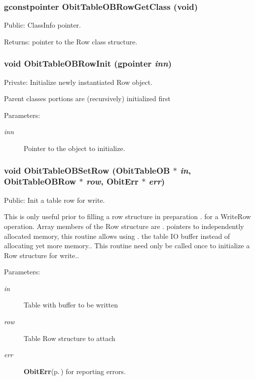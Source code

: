 \subsubsection{\setlength{\rightskip}{0pt plus 5cm}gconstpointer Obit\-Table\-OBRow\-Get\-Class (void)}\label{ObitTableOB_8c_a15}


Public: Class\-Info pointer. 

\begin{Desc}
\item[Returns:]pointer to the Row class structure. \end{Desc}
\subsubsection{\setlength{\rightskip}{0pt plus 5cm}void Obit\-Table\-OBRow\-Init (gpointer {\em inn})}\label{ObitTableOB_8c_a6}


Private: Initialize newly instantiated Row object. 

Parent classes portions are (recursively) initialized first \begin{Desc}
\item[Parameters:]
\begin{description}
\item[{\em inn}]Pointer to the object to initialize. \end{description}
\end{Desc}
\subsubsection{\setlength{\rightskip}{0pt plus 5cm}void Obit\-Table\-OBSet\-Row ({\bf Obit\-Table\-OB} $\ast$ {\em in}, {\bf Obit\-Table\-OBRow} $\ast$ {\em row}, {\bf Obit\-Err} $\ast$ {\em err})}\label{ObitTableOB_8c_a23}


Public: Init a table row for write. 

This is only useful prior to filling a row structure in preparation . for a Write\-Row operation. Array members of the Row structure are . pointers to independently allocated memory, this routine allows using . the table IO buffer instead of allocating yet more memory.. This routine need only be called once to initialize a Row structure for write.. \begin{Desc}
\item[Parameters:]
\begin{description}
\item[{\em in}]Table with buffer to be written \item[{\em row}]Table Row structure to attach \item[{\em err}]{\bf Obit\-Err}{\rm (p.\,\pageref{structObitErr})} for reporting errors. \end{description}
\end{Desc}
